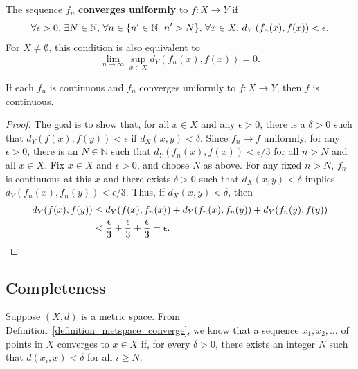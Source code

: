 \begin{definition}
The sequence $f_n$ \textbf{converges uniformly} to $f \colon X \to Y$ if \vspace{-1mm}
\[ \forall \epsilon > 0, \, \exists N\in \mathbb{N}, \, \forall n \in \{ n' \in \mathbb{N}\,|\, n'>N \}, \, \forall x\in X, \, d_Y \left( f_n(x),f(x) \right) < \epsilon. \vspace*{-1mm} \]
For $X \neq \emptyset$, this condition is also equivalent to \vspace{-1mm}
\[ \lim_{n\to \infty} \sup_{x\in X} d_Y \left( f_n (x) , f(x) \right) = 0. \]
 \end{definition}

\begin{theorem}
If each $f_n$ is continuous and $f_n$ converges uniformly to $f \colon X \to Y$, then $f$ is continuous.
\end{theorem}
\begin{proof}
The goal is to show that, for all $x\in X$ and any $\epsilon > 0$, there is a $\delta>0$ such that $d_Y (f (x),f (y)) < \epsilon$ if $d_X (x,y) < \delta$.
Since $f_n \to f$ uniformly, for any $\epsilon >0$, there is an $N\in \mathbb{N}$ such that $d_Y (f_n (x), f(x) ) < \epsilon / 3$ for all $n > N$ and all $x\in X$.
Fix $x\in X$ and $\epsilon>0$, and choose $N$ as above.
For any fixed $n>N$, $f_n$ is continuous at this $x$ and there exists $\delta>0$ such that $d_X(x,y)<\delta$ implies $d_Y(f_n(x),f_n(y))<\epsilon/3$.
Thus, if $d_X (x,y) < \delta$, then
\begin{align*}
d_Y (f(x),f(y))
&\leq d_Y (f(x),f_n (x)) + d_Y (f_n (x) ,f_n (y) ) + d_Y (f_n (y), f(y) ) \\
& < \frac{\epsilon}{3} + \frac{\epsilon}{3} + \frac{\epsilon}{3} = \epsilon. \qedhere
\end{align*}
\end{proof}


\subsection{Completeness}
\label{sec:metspace_complete}
Suppose $(X,d)$ is a metric space.
From Definition~\ref{definition_metspace_converge}, we know that a sequence $x_1, x_2, \ldots$ of points in $X$ converges to $x \in X$ if, for every $\delta >0$, there exists an integer $N$ such that $d(x_i,x)<\delta$ for all $i \geq N$.

